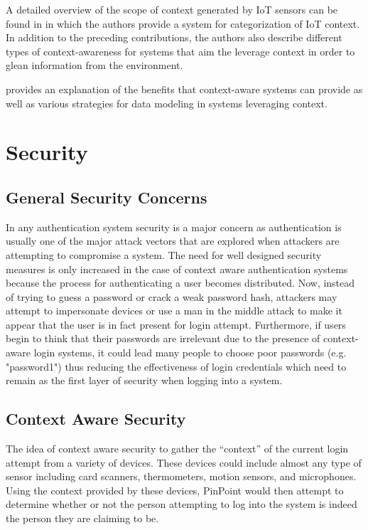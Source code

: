 \documentclass[11pt,journal]{IEEEtran}
\begin{document}
A detailed overview of the scope of context generated by IoT sensors can be found in \citet{Habib:2015} in which the authors provide a system for categorization of IoT context.  In addition to the preceding contributions, the authors also describe different types of context-awareness for systems that aim the leverage context in order to glean information from the environment.

\citet{strang2004context} provides an explanation of the benefits that context-aware systems can provide as well as various strategies for data modeling in systems leveraging context. 


\section{Security}

\subsection{General Security Concerns}
In any authentication system security is a major concern as authentication is usually one of the major attack vectors that are explored when attackers are attempting to compromise a system.  The need for well designed security measures is only increased in the case of context aware authentication systems because the process for authenticating a user becomes distributed.  Now, instead of trying to guess a password or crack a weak password hash, attackers may attempt to impersonate devices or use a man in the middle attack to make it appear that the user is in fact present for login attempt.  Furthermore, if users begin to think that their passwords are irrelevant due to the presence of context-aware login systems, it could lead many people to choose poor passwords (e.g. "password1") thus reducing the effectiveness of login credentials which need to remain as the first layer of security when logging into a system.

\subsection{Context Aware Security}
The idea of context aware security to gather the “context” of the current login attempt from a variety of devices.  These devices could include almost any type of sensor including card scanners, thermometers, motion sensors, and microphones.  Using the context provided by these devices, PinPoint would then attempt to determine whether or not the person attempting to log into the system is indeed the person they are claiming to be.
\end{document}
